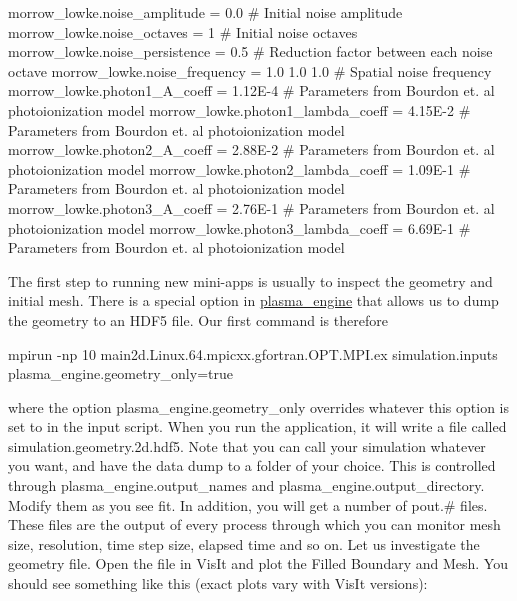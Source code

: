 \begin{DoxyVerb}
  morrow_lowke.noise_amplitude               = 0.0                   # Initial noise amplitude
  morrow_lowke.noise_octaves                 = 1                     # Initial noise octaves
  morrow_lowke.noise_persistence             = 0.5                   # Reduction factor between each noise octave
  morrow_lowke.noise_frequency               = 1.0 1.0 1.0           # Spatial noise frequency
  morrow_lowke.photon1_A_coeff               = 1.12E-4               # Parameters from Bourdon et. al photoionization model
  morrow_lowke.photon1_lambda_coeff          = 4.15E-2               # Parameters from Bourdon et. al photoionization model
  morrow_lowke.photon2_A_coeff               = 2.88E-2               # Parameters from Bourdon et. al photoionization model
  morrow_lowke.photon2_lambda_coeff          = 1.09E-1               # Parameters from Bourdon et. al photoionization model
  morrow_lowke.photon3_A_coeff               = 2.76E-1               # Parameters from Bourdon et. al photoionization model
  morrow_lowke.photon3_lambda_coeff          = 6.69E-1               # Parameters from Bourdon et. al photoionization model
\end{DoxyVerb}


The first step to running new mini-\/apps is usually to inspect the geometry and initial mesh. There is a special option in \hyperlink{classplasma__engine}{plasma\+\_\+engine} that allows us to dump the geometry to an H\+D\+F5 file. Our first command is therefore \begin{DoxyVerb}  mpirun -np 10 main2d.Linux.64.mpicxx.gfortran.OPT.MPI.ex simulation.inputs plasma_engine.geometry_only=true
\end{DoxyVerb}


where the option plasma\+\_\+engine.\+geometry\+\_\+only overrides whatever this option is set to in the input script. When you run the application, it will write a file called simulation.\+geometry.\+2d.\+hdf5. Note that you can call your simulation whatever you want, and have the data dump to a folder of your choice. This is controlled through plasma\+\_\+engine.\+output\+\_\+names and plasma\+\_\+engine.\+output\+\_\+directory. Modify them as you see fit. In addition, you will get a number of pout.\# files. These files are the output of every process through which you can monitor mesh size, resolution, time step size, elapsed time and so on. Let us investigate the geometry file. Open the file in Vis\+It and plot the Filled Boundary and Mesh. You should see something like this (exact plots vary with Vis\+It versions)\+:



